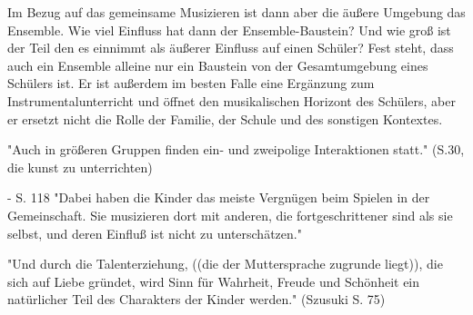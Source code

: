 Im Bezug auf das gemeinsame Musizieren ist dann aber die äußere Umgebung das
Ensemble. Wie viel Einfluss hat dann der Ensemble-Baustein? Und wie groß ist der
Teil den es einnimmt als äußerer Einfluss auf einen Schüler? Fest steht, dass
auch ein Ensemble alleine nur ein Baustein von der Gesamtumgebung eines Schülers
ist. Er ist außerdem im besten Falle eine Ergänzung zum Instrumentalunterricht
und öffnet den musikalischen Horizont des Schülers, aber er ersetzt nicht die
Rolle der Familie, der Schule und des sonstigen Kontextes. 

"Auch in größeren Gruppen finden ein- und zweipolige Interaktionen statt."
(S.30, die kunst zu unterrichten)

- S. 118 "Dabei haben die Kinder das meiste Vergnügen beim Spielen in der
Gemeinschaft. Sie musizieren dort mit anderen, die fortgeschrittener sind als
sie selbst, und deren Einfluß ist nicht zu unterschätzen." 



















"Und durch die Talenterziehung, ((die der Muttersprache zugrunde liegt)), die
sich auf Liebe gründet, wird Sinn für Wahrheit, Freude und Schönheit ein
natürlicher Teil des Charakters der Kinder werden." (Szusuki S. 75)

